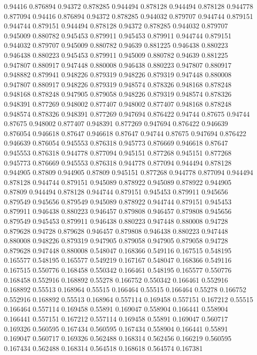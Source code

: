 0.94416 0.876894
0.94372 0.878285
0.944494 0.878128
0.944494 0.878128
0.944778 0.877094
0.94416 0.876894
0.94372 0.878285
0.944032 0.879707
0.944744 0.879151
0.944744 0.879151
0.944494 0.878128
0.94372 0.878285
0.944032 0.879707
0.945009 0.880782
0.945453 0.879911
0.945453 0.879911
0.944744 0.879151
0.944032 0.879707
0.945009 0.880782
0.94639 0.881225
0.946438 0.880223
0.946438 0.880223
0.945453 0.879911
0.945009 0.880782
0.94639 0.881225
0.947807 0.880917
0.947448 0.880008
0.946438 0.880223
0.947807 0.880917
0.948882 0.879941
0.948226 0.879319
0.948226 0.879319
0.947448 0.880008
0.947807 0.880917
0.948226 0.879319
0.948574 0.878326
0.948168 0.878248
0.948168 0.878248
0.947905 0.879058
0.948226 0.879319
0.948574 0.878326
0.948391 0.877269
0.948002 0.877407
0.948002 0.877407
0.948168 0.878248
0.948574 0.878326
0.948391 0.877269
0.947694 0.876422
0.94744 0.87675
0.94744 0.87675
0.948002 0.877407
0.948391 0.877269
0.947694 0.876422
0.946639 0.876054
0.946618 0.87647
0.946618 0.87647
0.94744 0.87675
0.947694 0.876422
0.946639 0.876054
0.945553 0.876318
0.945773 0.876669
0.946618 0.87647
0.945553 0.876318
0.944778 0.877094
0.945151 0.877268
0.945151 0.877268
0.945773 0.876669
0.945553 0.876318
0.944778 0.877094
0.944494 0.878128
0.944905 0.87809
0.944905 0.87809
0.945151 0.877268
0.944778 0.877094
0.944494 0.878128
0.944744 0.879151
0.945089 0.878922
0.945089 0.878922
0.944905 0.87809
0.944494 0.878128
0.944744 0.879151
0.945453 0.879911
0.945656 0.879549
0.945656 0.879549
0.945089 0.878922
0.944744 0.879151
0.945453 0.879911
0.946438 0.880223
0.946457 0.879808
0.946457 0.879808
0.945656 0.879549
0.945453 0.879911
0.946438 0.880223
0.947448 0.880008
0.94728 0.879628
0.94728 0.879628
0.946457 0.879808
0.946438 0.880223
0.947448 0.880008
0.948226 0.879319
0.947905 0.879058
0.947905 0.879058
0.94728 0.879628
0.947448 0.880008
0.548047 0.168366
0.549116 0.167515
0.548195 0.165577
0.548195 0.165577
0.549219 0.167167
0.548047 0.168366
0.549116 0.167515
0.550776 0.168458
0.550342 0.166461
0.548195 0.165577
0.550776 0.168458
0.552916 0.168892
0.55278 0.166752
0.550342 0.166461
0.552916 0.168892
0.55513 0.168964
0.55515 0.166464
0.55515 0.166464
0.55278 0.166752
0.552916 0.168892
0.55513 0.168964
0.557114 0.169458
0.557151 0.167212
0.55515 0.166464
0.557114 0.169458
0.55891 0.169047
0.558904 0.166441
0.558904 0.166441
0.557151 0.167212
0.557114 0.169458
0.55891 0.169047
0.560717 0.169326
0.560595 0.167434
0.560595 0.167434
0.558904 0.166441
0.55891 0.169047
0.560717 0.169326
0.562488 0.168314
0.562456 0.166219
0.560595 0.167434
0.562488 0.168314
0.564518 0.168618
0.564574 0.167381
